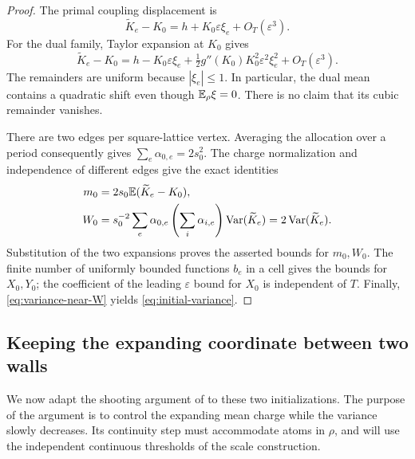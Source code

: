 \begin{proof}
The primal coupling displacement is
\[
 \widetilde K_e-K_0=h+K_0\varepsilon\xi_e+O_T(\varepsilon^3).
\]
For the dual family, Taylor expansion at \(K_0\) gives
\begin{equation}
 \widetilde K_e-K_0
 =h-K_0\varepsilon\xi_e
   +\tfrac12g''(K_0)K_0^2\varepsilon^2\xi_e^2
   +O_T(\varepsilon^3).
 \label{eq:dual-initial-expansion}
\end{equation}
The remainders are uniform because \(|\xi_e|\le1\).  In particular,
the dual mean contains a quadratic shift even though \(\mathbb E_\rho\xi=0\).
There is no claim that its cubic remainder vanishes.

There are two edges per square-lattice vertex.  Averaging the allocation
over a period consequently gives
\(\sum_e\alpha_{0,e}=2s_0^2\).  The charge normalization and
independence of different edges give the exact identities
\begin{align}
 m_0&=2s_0\mathbb E(\widetilde K_e-K_0),\notag\\
 W_0&=s_0^{-2}\sum_e\alpha_{0,e}
          \left(\sum_i\alpha_{i,e}\right)\operatorname{Var}(\widetilde K_e)
      =2\operatorname{Var}(\widetilde K_e).
 \label{eq:initial-charge-variance}
\end{align}
Substitution of the two expansions proves the asserted bounds for
\(m_0,W_0\).  The finite number of uniformly bounded functions \(b_e\)
in a cell gives the bounds for \(X_0,Y_0\); the coefficient of the
leading \(\varepsilon\) bound for \(X_0\) is independent of \(T\).
Finally, \eqref{eq:variance-near-W} yields
\eqref{eq:initial-variance}.
\end{proof}

\subsection{Keeping the expanding coordinate between two walls}

We now adapt the shooting argument of \cite[Section~6]{R} to these
two initializations.  The purpose of the argument is to control the
expanding mean charge while the variance slowly decreases.  Its
continuity step must accommodate atoms in \(\rho\), and will use the
independent continuous thresholds of the scale construction.

